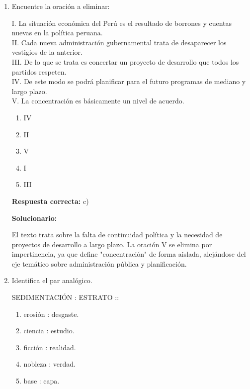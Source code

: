 \begin{enumerate}[resume]
	El primer espacio requiere un conector concesivo ("a pesar") que indique que el resultado fue adverso pese a la preparación. El segundo espacio requiere un conector adversativo ("sin embargo") para introducir la idea de esperanza en la perseverancia futura.
	
	\vspace{6mm}
	
	\item Encuentre la oración a eliminar:
	
	I. La situación económica del Perú es el resultado de borrones y cuentas nuevas en la política peruana. \\
	II. Cada nueva administración gubernamental trata de desaparecer los vestigios de la anterior. \\
	III. De lo que se trata es concertar un proyecto de desarrollo que todos los partidos respeten. \\
	IV. De este modo se podrá planificar para el futuro programas de mediano y largo plazo. \\
	V. La concentración es básicamente un nivel de acuerdo.
	
	\begin{enumerate}[label=\alph*)]
		\item IV
		\item II
		\item V
		\item I
		\item III
	\end{enumerate}
	
	\textbf{Respuesta correcta:} c)
	
	\vspace{2mm}
	\textbf{Solucionario:}
	
	El texto trata sobre la falta de continuidad política y la necesidad de proyectos de desarrollo a largo plazo. La oración V se elimina por impertinencia, ya que define "concentración" de forma aislada, alejándose del eje temático sobre administración pública y planificación.
	
	\vspace{6mm}
	
	\item Identifica el par analógico.
	
	SEDIMENTACIÓN : ESTRATO ::
	
	\begin{enumerate}[label=\alph*)]
		\item erosión : desgaste.
		\item ciencia : estudio.
		\item ficción : realidad.
		\item nobleza : verdad.
		\item base : capa.
	\end{enumerate}
	

\end{enumerate}
